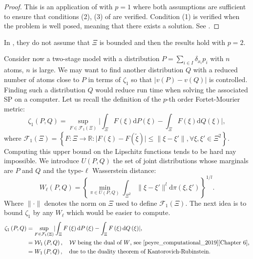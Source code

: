 \documentclass{amsart}
\newcommand{\RR}{\mathbb{R}}
\begin{document}
\begin{proof}
    This is an application of  with $p=1$ where both assumptions are sufficient to ensure that conditions (2), (3) of  are verified. Condition (1) is verified when the problem is well posed, meaning that there exists a solution. See \cite[Proposition 22]{romisch_stability_2003}.
\end{proof}
\begin{remark}
    In \cite{romisch_stability_2003}, they do not assume that $\Xi$ is bounded and then the results hold with $p=2$.
\end{remark}
Consider now a two-stage model with a distribution $P=\sum_{i\in I}\delta_{x_i}p_i$ with $n$ atoms, $n$ is large. We may want to find another distribution $Q$ with a reduced number of atoms close to $P$ in terms of $\zeta_1$ so that $\lvert v\left(P\right)-v\left(Q\right)\rvert$ is controlled. Finding such a distribution $Q$ would reduce run time when solving the associated SP on a computer. Let us recall the definition of the $p$-th order Fortet-Mourier metric:
$$
\zeta_1\left(P,Q\right)=\sup_{F\in\mathcal{F}_1\left(\Xi\right)}\lvert \int_\Xi F\left(\xi\right)\text{d}P\left(\xi\right)-\int_\Xi F\left(\xi\right)\text{d}Q\left(\xi\right)\rvert,
$$
where $\mathcal{F}_1\left(\Xi\right)=\left\{F:\Xi\to \RR: \lvert F\left(\xi\right)-F\left(\tilde{\xi}\right)\rvert \leq \lVert\xi-\xi'\rVert, \forall \xi,\xi'\in \Xi^2 \right\}$. Computing this upper bound on the Lipschitz functions tends to be hard nay impossible. We introduce $U\left(P,Q\right)$ the set of joint distributions whose marginals are $P$ and $Q$ and the type-$\ell$ Wasserstein distance: $$
W_\ell\left(P,Q\right) = \left\{\min_{\pi\in U\left(P,Q\right)}\int_{\Xi^2}\lVert \xi-\xi'\rVert^l \text{d}\pi\left(\xi,\xi'\right)\right\}^{1/l}.$$
Where $\lVert \cdot \rVert$ denotes the norm on $\Xi$ used to define $\mathcal{F}_1\left(\Xi\right)$. The next idea is to bound $\zeta_1$ by any $W_\ell$ which would be easier to compute.
\begin{align*}
    \zeta_1\left(P,Q\right)&= \sup_{F\in\mathcal{F}_1\left(\Xi\right)}\lvert \int_\Xi F\left(\xi\right)\text{d}P\left(\xi\right)-\int_\Xi F\left(\xi\right)\text{d}Q\left(\xi\right)\rvert, \\
    &=\mathcal{W}_1\left(P,Q\right), \quad \mathcal{W} \text{ being the dual of } W \text{, see \cite{peyre_computational_2019}[Chapter 6],}\\
    &= W_1\left(P,Q\right), \quad \text{due to the duality theorem of Kantorovich-Rubinstein.}
\end{align*}
\end{document}
